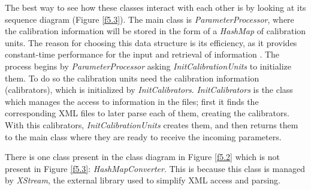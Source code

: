 The best way to see how these classes interact with each other is by looking at its sequence diagram (Figure \ref{f5.3}). The main class is \emph{ParameterProcessor}, where the calibration information will be stored in the form of a \emph{HashMap} of calibration units. The reason for choosing this data structure is its efficiency, as it provides constant-time performance for the input and retrieval of information \cite{HashMap}. The process begins by \emph{ParameterProcessor} asking \emph{InitCalibrationUnits} to initialize them. To do so the calibration units need the calibration information (calibrators), which is initialized  by \emph{InitCalibrators}. \emph{InitCalibrators} is the class which manages the access to information in the files; first it finds the corresponding XML files to later parse each of them, creating the calibrators. With this calibrators, \emph{InitCalibrationUnits} creates them, and then returns them to the main class where they are ready to receive the incoming parameters.

There is one class present in the class diagram in Figure \ref{f5.2} which is not present in Figure \ref{f5.3}: \emph{HashMapConverter}. This is because this class is managed by \emph{XStream}, the external library used to simplify XML access and parsing. 


